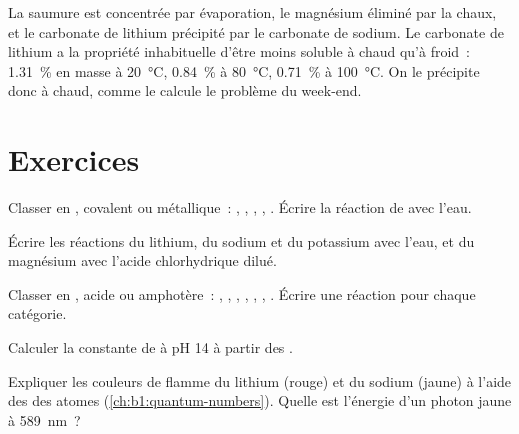 La saumure est concentrée par évaporation, le magnésium éliminé par la
chaux, et le carbonate de lithium précipité par le carbonate de sodium.
Le carbonate de lithium a la propriété inhabituelle d'être moins soluble
à chaud qu'à froid~: \qty{1.31}{\percent}
en masse à \qty{20}{\celsius}, \qty{0.84}{\percent} à \qty{80}{\celsius},
\qty{0.71}{\percent} à \qty{100}{\celsius}. On le précipite donc à
chaud, comme le calcule le problème du week-end.

\section{Exercices}

\begin{exercise}[$\star$]\label{exo:b1:s-block:1}
Classer en , covalent ou métallique~: , ,
, , . Écrire la réaction de  avec l'eau.
\end{exercise}

\begin{exercise}[$\star$]\label{exo:b1:s-block:2}
Écrire les réactions du lithium, du sodium et du potassium avec l'eau,
et du magnésium avec l'acide chlorhydrique dilué.
\end{exercise}

\begin{exercise}[$\star$]\label{exo:b1:s-block:3}
Classer en , acide ou amphotère~: , , ,
, , , . Écrire une réaction pour chaque
catégorie.
\end{exercise}

\begin{exercise}[$\star$]\label{exo:b1:s-block:4}
Calculer la constante de  à pH 14 à
partir des .
\end{exercise}

\begin{exercise}[$\star\star$]\label{exo:b1:s-block:5}
Expliquer les couleurs de flamme du lithium (rouge) et du sodium (jaune)
à l'aide des  des atomes (\cref{ch:b1:quantum-numbers}).
Quelle est l'énergie d'un photon jaune à \qty{589}{nm}~?
\end{exercise}

